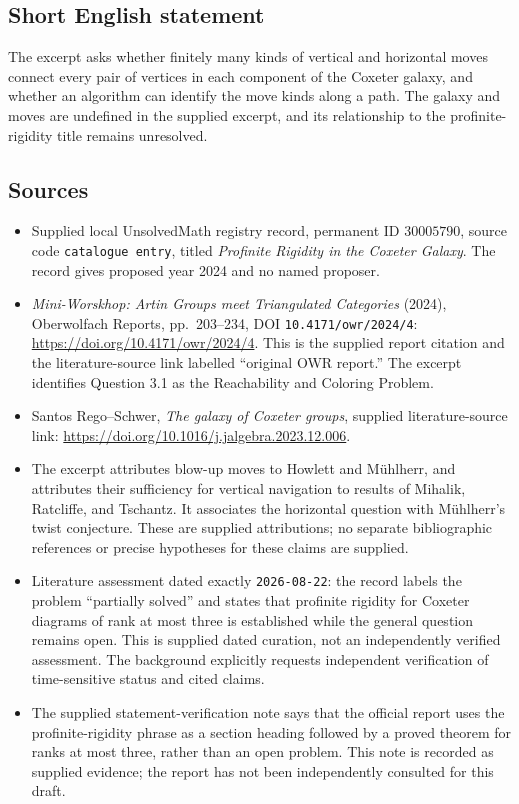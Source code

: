 \documentclass[11pt]{article}
\begin{document}
\subsection{Short English statement}
The excerpt asks whether finitely many kinds of vertical and horizontal moves connect every pair of vertices in each component of the Coxeter galaxy, and whether an algorithm can identify the move kinds along a path. The galaxy and moves are undefined in the supplied excerpt, and its relationship to the profinite-rigidity title remains unresolved.
\subsection{Sources}
\begin{itemize}
\item Supplied local UnsolvedMath registry record, permanent ID \(30005790\), source code \texttt{catalogue entry}, titled \emph{Profinite Rigidity in the Coxeter Galaxy}. The record gives proposed year 2024 and no named proposer.
\item \emph{Mini-Worskhop: Artin Groups meet Triangulated Categories} (2024), Oberwolfach Reports, pp.~203--234, DOI \texttt{10.4171/owr/2024/4}: \url{https://doi.org/10.4171/owr/2024/4}. This is the supplied report citation and the literature-source link labelled ``original OWR report.'' The excerpt identifies Question 3.1 as the Reachability and Coloring Problem.
\item Santos Rego--Schwer, \emph{The galaxy of Coxeter groups}, supplied literature-source link: \url{https://doi.org/10.1016/j.jalgebra.2023.12.006}.
\item The excerpt attributes blow-up moves to Howlett and M\"uhlherr, and attributes their sufficiency for vertical navigation to results of Mihalik, Ratcliffe, and Tschantz. It associates the horizontal question with M\"uhlherr's twist conjecture. These are supplied attributions; no separate bibliographic references or precise hypotheses for these claims are supplied.
\item Literature assessment dated exactly \texttt{2026-08-22}: the record labels the problem ``partially solved'' and states that profinite rigidity for Coxeter diagrams of rank at most three is established while the general question remains open. This is supplied dated curation, not an independently verified assessment. The background explicitly requests independent verification of time-sensitive status and cited claims.
\item The supplied statement-verification note says that the official report uses the profinite-rigidity phrase as a section heading followed by a proved theorem for ranks at most three, rather than an open problem. This note is recorded as supplied evidence; the report has not been independently consulted for this draft.
\end{itemize}
\end{document}
